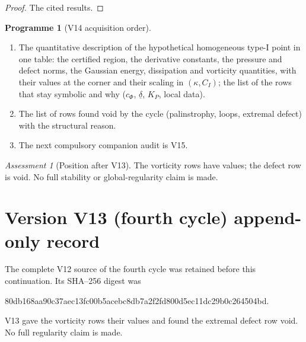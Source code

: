 \documentclass[11pt]{article}
\theoremstyle{plain}
\theoremstyle{definition}
\newtheorem{programme}[theorem]{Programme}
\theoremstyle{remark}
\newtheorem{assessment}[theorem]{Assessment}
\begin{document}
\begin{proof}
The cited results.
\end{proof}

\begin{programme}[V14 acquisition order]
\label{prog:c4v14}
\begin{enumerate}[label=\textup{(AC\arabic*)},leftmargin=4.8em]
\item The quantitative description of the hypothetical homogeneous
      type-I point in one table: the certified region, the derivative
      constants, the pressure and defect norms, the Gaussian energy,
      dissipation and vorticity quantities, with their values at the
      corner and their scaling in \((\kappa,C_I)\); the list of the rows that
      stay symbolic and why (\(c_\Phi\), \(\underline\delta\), \(K_P\), local data).
\item The list of rows found void by the cycle (palinstrophy, loops,
      extremal defect) with the structural reason.
\item The next compulsory companion audit is V15.
\end{enumerate}
\end{programme}

\begin{assessment}[Position after V13]
\label{ass:c4v13-position}
The vorticity rows have values; the defect row is void.  No full
stability or global-regularity claim is made.
\end{assessment}

\section*{Version V13 (fourth cycle) append-only record}

The complete V12 source of the fourth cycle was retained before this
continuation.  Its SHA--256 digest was
\begin{center}\scriptsize\ttfamily
80db168aa90c37aec13fc00b5acebc8db7a2f2fd800d5ec11dc29b0c264504bd.
\end{center}
V13 gave the vorticity rows their values and found the extremal
defect row void.  No full regularity claim is made.

\end{document}
